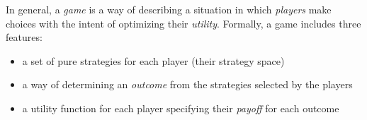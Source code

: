 \documentclass[12pt]{article}
\begin{document}
In general, a \emph{game} is a way of describing a situation in which \emph{players} make choices with the intent of optimizing their \emph{utility}.  Formally, a game includes three features:
\begin{itemize}

\item a set of pure strategies for each player (their strategy space)

\item a way of determining an \emph{outcome} from the strategies selected by the players

\item a utility function for each player specifying their \emph{payoff} for each outcome

\end{itemize}
\end{document}
